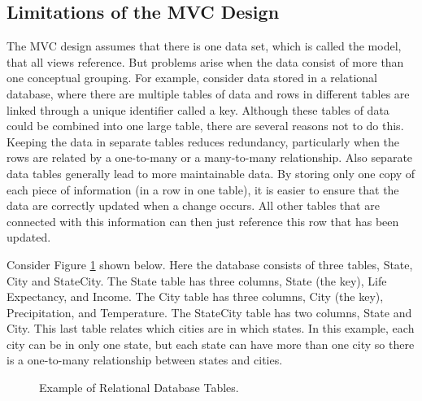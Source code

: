 \documentclass{article}[11pt]
\begin{document}
\subsection{Limitations of the MVC Design}\label{Ssec:Limit}

The MVC design assumes that there is one data set, which is called the model,
that all views reference.  But problems arise when the data consist of more
than one conceptual grouping.  For example, consider data stored in a
relational database, where there are multiple tables of data and rows in
different tables are linked through a unique identifier called a key.
Although these tables of data could be combined into one large table, there
are several reasons not to do this.  Keeping the data in separate tables
reduces redundancy, particularly when the rows are related by a one-to-many or
a many-to-many relationship.  Also separate data tables generally lead to more
maintainable data.  By storing only one copy of each piece of information (in
a row in one table), it is easier to ensure that the data are correctly
updated when a change occurs.  All other tables that are connected with this
information can then just reference this row that has been updated. 

Consider Figure \ref{Fig:DBTab} shown below.  Here the database consists of
three tables, State, City and StateCity.  The State table has three columns,
State (the key), Life Expectancy, and Income.  The City table has three
columns, City (the key), Precipitation, and Temperature.  The StateCity table
has two columns, State and City.  This last table relates which cities are in
which states.  In this example, each city can be in only one state, but each
state can have more than one city so there is a one-to-many relationship
between states and cities.


\begin{figure}[ht]
  \begin{center}
    \caption{ Example of Relational Database Tables. }
    \label{Fig:DBTab}
  \end{center}
\end{figure}
\end{document}
